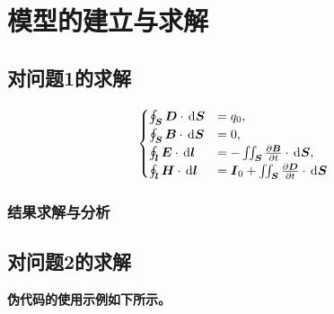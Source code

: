
\section{模型的建立与求解}


\subsection{对问题1的求解}

\zhlipsum[1]

\begin{equation}\label{equ:麦克斯韦方程组}
\begin{cases}
\oint_{\bk{S}}\bk{D}\cdot\diff\bk{S} &= q_0, \\
\oint_{\bk{S}}\bk{B}\cdot\diff\bk{S} &= 0, \\
\oint_{\bk{l}}\bk{E}\cdot\diff\bk{l} &= -\iint_{\bk{S}}\frac{\partial \bk{B}}{\partial t}\cdot\diff\bk{S}, \\
\oint_{\bk{l}}\bk{H}\cdot\diff\bk{l} &= \bk{I}_0 + \iint_{\bk{S}}\frac{\partial \bk{D}}{\partial t}\cdot\diff\bk{S}
\end{cases}
\end{equation}

\zhlipsum[2]

\subsubsection{结果求解与分析}



\subsection{对问题2的求解}

{\bf 伪代码的使用示例如下所示。}

